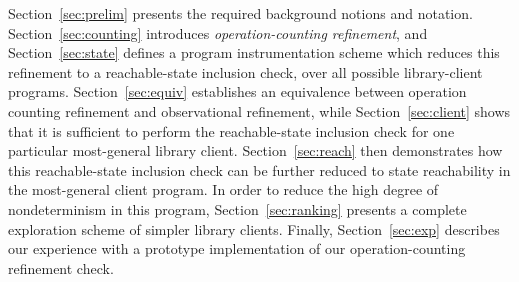 Section~\ref{sec:prelim} presents the required background notions and notation.
Section~\ref{sec:counting} introduces \emph{operation-counting refinement}, and
Section~\ref{sec:state} defines a program instrumentation scheme which reduces this refinement to a
reachable-state inclusion check, over all possible library-client programs.
Section~\ref{sec:equiv} establishes an equivalence between operation counting
refinement and observational refinement, while Section~\ref{sec:client} shows
that it is sufficient to perform the reachable-state inclusion check for one
particular most-general library client. Section~\ref{sec:reach} then
demonstrates how this reachable-state inclusion check can be further reduced to
state reachability in the most-general client program. In order to reduce
the high degree of nondeterminism in this program, Section~\ref{sec:ranking} presents
a complete exploration scheme of simpler library clients.
Finally,
Section~\ref{sec:exp} describes our experience with a prototype implementation
of our operation-counting refinement check.
